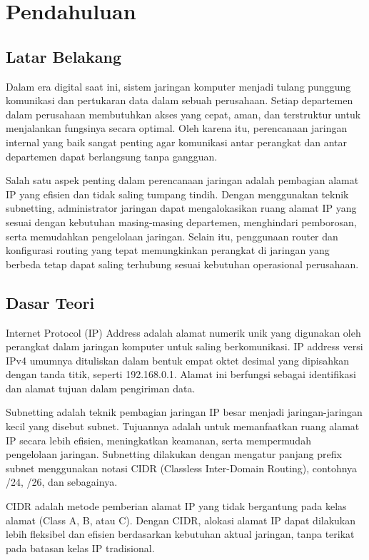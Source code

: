 \section{Pendahuluan}

\subsection{Latar Belakang}
Dalam era digital saat ini, sistem jaringan komputer menjadi tulang punggung komunikasi dan pertukaran data dalam sebuah perusahaan. Setiap departemen dalam perusahaan membutuhkan akses yang cepat, aman, dan terstruktur untuk menjalankan fungsinya secara optimal. Oleh karena itu, perencanaan jaringan internal yang baik sangat penting agar komunikasi antar perangkat dan antar departemen dapat berlangsung tanpa gangguan.

Salah satu aspek penting dalam perencanaan jaringan adalah pembagian alamat IP yang efisien dan tidak saling tumpang tindih. Dengan menggunakan teknik subnetting, administrator jaringan dapat mengalokasikan ruang alamat IP yang sesuai dengan kebutuhan masing-masing departemen, menghindari pemborosan, serta memudahkan pengelolaan jaringan. Selain itu, penggunaan router dan konfigurasi routing yang tepat memungkinkan perangkat di jaringan yang berbeda tetap dapat saling terhubung sesuai kebutuhan operasional perusahaan.

\subsection{Dasar Teori}

Internet Protocol (IP) Address adalah alamat numerik unik yang digunakan oleh perangkat dalam jaringan komputer untuk saling berkomunikasi. IP address versi IPv4 umumnya dituliskan dalam bentuk empat oktet desimal yang dipisahkan dengan tanda titik, seperti 192.168.0.1. Alamat ini berfungsi sebagai identifikasi dan alamat tujuan dalam pengiriman data.

Subnetting adalah teknik pembagian jaringan IP besar menjadi jaringan-jaringan kecil yang disebut subnet. Tujuannya adalah untuk memanfaatkan ruang alamat IP secara lebih efisien, meningkatkan keamanan, serta mempermudah pengelolaan jaringan. Subnetting dilakukan dengan mengatur panjang prefix subnet menggunakan notasi CIDR (Classless Inter-Domain Routing), contohnya /24, /26, dan sebagainya.

CIDR adalah metode pemberian alamat IP yang tidak bergantung pada kelas alamat (Class A, B, atau C). Dengan CIDR, alokasi alamat IP dapat dilakukan lebih fleksibel dan efisien berdasarkan kebutuhan aktual jaringan, tanpa terikat pada batasan kelas IP tradisional.

